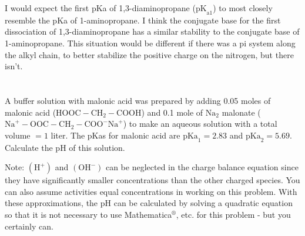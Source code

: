 \documentclass[12pt]{article}
\begin{document}
I would expect the first pKa of 1,3-diaminopropane ($\mathrm{pK}_{\mathrm{a} 1}$) to most closely resemble the pKa of 1-aminopropane. I think the conjugate base for the first dissociation of 1,3-diaminopropane has a similar stability to the conjugate base of 1-aminopropane. This situation would be different if there was a pi system along the alkyl chain, to better stabilize the positive charge on the nitrogen, but there isn't.
\newpage
\section{}
A buffer solution with malonic acid was prepared by adding 0.05 moles of malonic acid ($\mathrm{HOOC}-\mathrm{CH}_{2}-\mathrm{COOH}$) and 0.1 mole of $\mathrm{Na}_{2}$ malonate ($\mathrm{Na}^{+}-\mathrm{OOC}-\mathrm{CH}_{2}-\mathrm{COO}^{-}\mathrm{Na}^{+}$) to make an aqueous solution with a total volume $=1$ liter. The pKas for malonic acid are $\mathrm{pKa}_{1}=2.83$ and $\mathrm{pKa}_{2}=5.69$. Calculate the $\mathrm{pH}$ of this solution. 


Note: $(\mathrm{H}^{+})$ and $(\mathrm{OH}^{-})$ can be neglected in the charge balance equation since they have significantly smaller concentrations than the other charged species. You can also assume activities equal concentrations in working on this problem. With these approximations, the $\mathrm{pH}$ can be calculated by solving a quadratic equation so that it is not necessary to use Mathematica$^{\circledR}$, etc. for this problem - but you certainly can.
\end{document}
